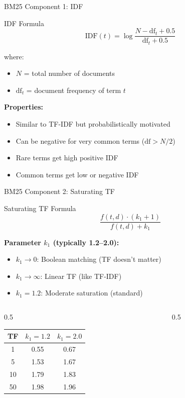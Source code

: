 \documentclass[aspectratio=169]{beamer}
\newif\ifanimated
\newcommand{\cpause}{\ifanimated\pause\fi}
\begin{document}
\begin{frame}{BM25 Component 1: IDF}
\begin{block}{IDF Formula}
$$\text{IDF}(t) = \log\frac{N - \text{df}_t + 0.5}{\text{df}_t + 0.5}$$
\end{block}

where:
\begin{itemize}
    \item $N$ = total number of documents
    \item $\text{df}_t$ = document frequency of term $t$
\end{itemize}\cpause

\vspace{1em}

\textbf{Properties:}
\begin{itemize}
    \item Similar to TF-IDF but probabilistically motivated
    \item Can be negative for very common terms ($\text{df} > N/2$)
    \item Rare terms get high positive IDF
    \item Common terms get low or negative IDF
\end{itemize}\cpause
\end{frame}

\begin{frame}{BM25 Component 2: Saturating TF}
\begin{block}{Saturating TF Formula}
$$\frac{f(t,d) \cdot (k_1+1)}{f(t,d) + k_1}$$
\end{block}

\textbf{Parameter $k_1$ (typically 1.2--2.0):}
\begin{itemize}
    \item $k_1 \to 0$: Boolean matching (TF doesn't matter)
    \item $k_1 \to \infty$: Linear TF (like TF-IDF)
    \item $k_1 = 1.2$: Moderate saturation (standard)
\end{itemize}\cpause

\vspace{1em}

\begin{columns}
\begin{column}{0.5\textwidth}
\small
\begin{tabular}{ccc}
\toprule
\textbf{TF} & \textbf{$k_1=1.2$} & \textbf{$k_1=2.0$} \\
\midrule
1 & 0.55 & 0.67 \\
5 & 1.53 & 1.67 \\
10 & 1.79 & 1.83 \\
50 & 1.98 & 1.96 \\
\bottomrule
\end{tabular}
\end{column}

\begin{column}{0.5\textwidth}

\end{column}
\end{columns}
\end{frame}
\end{document}
